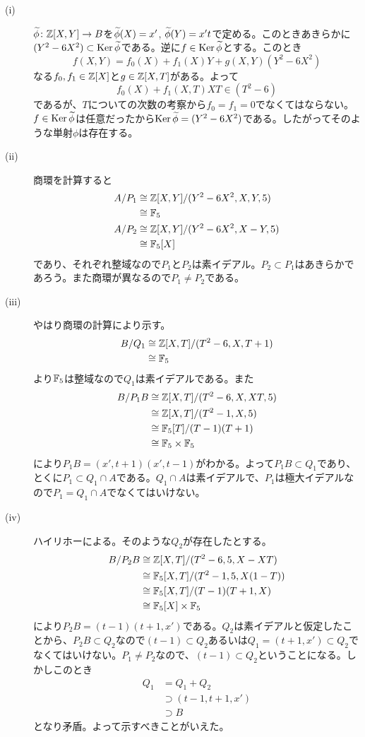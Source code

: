 \begin{sol} ${}$
  \begin{description}
\item[(i)] $\widetilde{\phi} \colon {\mathbb Z}[X,Y] \to B$を$\widetilde{\phi}(X) = x'$, $\widetilde{\phi}(Y) = x't$で定める。このときあきらかに$(Y^2 - 6X^2) \subset \operatorname{Ker} \widetilde{\phi}$である。逆に$f \in \operatorname{Ker} \widetilde{\phi}$とする。このとき
\[
f(X,Y)=f_0(X) + f_1(X) Y + g(X,Y)(Y^2 - 6X^2)
\]
なる$f_0, f_1 \in {\mathbb Z}[X]$と$g \in {\mathbb Z}[X,T]$がある。よって
\[
f_0(X) + f_1(X,T)XT \in (T^2 - 6)
\]
であるが、$T$についての次数の考察から$f_0 = f_1 = 0$でなくてはならない。$f \in \operatorname{Ker} \widetilde{\phi}$は任意だったから$\operatorname{Ker} \widetilde{\phi} = (Y^2 - 6X^2)$である。したがってそのような単射$\phi$は存在する。
\item[(ii)] 商環を計算すると
\begin{align*}
  A/P_1 &\cong {\mathbb Z}[X,Y]/(Y^2 - 6X^2, X, Y , 5) \\
  &\cong {\mathbb F}_5 \\
  A/P_2 &\cong {\mathbb Z}[X,Y]/(Y^2 - 6X^2, X-Y , 5) \\
  &\cong {\mathbb F}_5[X]
\end{align*}
であり、それぞれ整域なので$P_1$と$P_2$は素イデアル。$P_2 \subset P_1$はあきらかであろう。また商環が異なるので$P_1 \neq P_2$である。
\item[(iii)] やはり商環の計算により示す。
\begin{align*}
  B/Q_1 &\cong {\mathbb Z}[X,T]/(T^2 - 6, X,T+1) \\
  &\cong {\mathbb F}_5
\end{align*}
より${\mathbb F}_5$は整域なので$Q_1$は素イデアルである。また
\begin{align*}
  B/P_1 B &\cong {\mathbb Z}[X,T]/(T^2-6,X,XT,5) \\
  &\cong {\mathbb Z}[X,T]/(T^2-1,X,5) \\
  &\cong {\mathbb F}_5[T]/(T-1)(T+1) \\
  &\cong {\mathbb F}_5 \times {\mathbb F}_5
\end{align*}
により$P_1B = (x', t+1)(x', t-1)$がわかる。よって$P_1 B \subset Q_1$であり、とくに$P_1 \subset Q_1 \cap A$である。$Q_1 \cap A$は素イデアルで、$P_1$は極大イデアルなので$P_1 = Q_1 \cap A$でなくてはいけない。
\item[(iv)] ハイリホーによる。そのような$Q_2$が存在したとする。
\begin{align*}
  B/P_2B &\cong  {\mathbb Z}[X,T]/(T^2-6,5,X-XT) \\
  &\cong {\mathbb F}_5[X,T]/(T^2-1,5,X(1-T) ) \\
  &\cong {\mathbb F}_5[X,T]/(T-1)(T+1, X) \\
  &\cong {\mathbb F}_5[X] \times {\mathbb F}_5
\end{align*}
により$P_2B = (t-1)(t+1,x')$である。$Q_2$は素イデアルと仮定したことから、$P_2B \subset Q_2$なので$(t-1) \subset Q_2$あるいは$Q_1 =  (t+1,x') \subset Q_2$でなくてはいけない。$P_1 \neq P_2$なので、$(t-1) \subset Q_2$ということになる。しかしこのとき
\begin{align*}
  Q_1 &= Q_1 + Q_2 \\
  &\supset (t-1, t+1,x') \\
  &\supset B
\end{align*}
となり矛盾。よって示すべきことがいえた。
  \end{description}
\end{sol}

